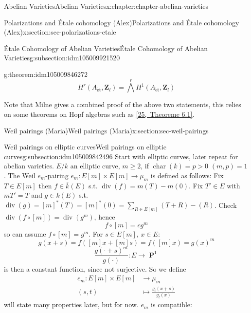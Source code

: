 \documentclass[oneside,10pt,]{book}
\numberwithin{equation}{section}
\newcommand{\lb}{[}
\newcommand{\rb}{]}
\newcommand{\ZZ}{\mathbf{Z}}
\newcommand{\et}{\mathrm{\acute{e}t}}
\DeclareMathOperator{\divisor}{div}
\DeclareMathOperator{\characteristic}{char}
\DeclareMathOperator{\PP}{\mathbf{P}}
\newcommand{\gt}{>}
\newcommand{\amp}{&}
\begin{document}
\begin{chapterptx}{Abelian Varieties}{}{Abelian Varieties}{}{}{x:chapter:chapter-abelian-varieties}
\begin{sectionptx}{Polarizations and Étale cohomology (Alex)}{}{Polarizations and Étale cohomology (Alex)}{}{}{x:section:sec-polarizations-etale}
\begin{subsectionptx}{Étale Cohomology of Abelian Varieties}{}{Étale Cohomology of Abelian Varieties}{}{}{g:subsection:idm105009921520}
\begin{theorem}{}{}{g:theorem:idm105009846272}
%
\begin{equation*}
H^r(A_\et, \ZZ_l) = \bigwedge^r H^1(A_\et, \ZZ_l)
\end{equation*}
%
\end{theorem}
Note that Milne gives a combined proof of the above two statements, this relies on some theorems on Hopf algebras such as \hyperlink{x:biblio:bib-borel-hopf}{[25,~Theoreme 6.1]}.%
\end{subsectionptx}
\end{sectionptx}
%
%
\typeout{************************************************}
\typeout{************************************************}
%
\begin{sectionptx}{Weil pairings (Maria)}{}{Weil pairings (Maria)}{}{}{x:section:sec-weil-pairings}
%
%
\typeout{************************************************}
\typeout{************************************************}
%
\begin{subsectionptx}{Weil pairings on elliptic curves}{}{Weil pairings on elliptic curves}{}{}{g:subsection:idm105009842496}
Start with elliptic curves, later repeat for abelian varieties. \(E/k\) an elliptic curve, \(m\ge 2\), if \(\characteristic(k) = p \gt 0\) \((m,p) = 1\). The Weil \(e_m\)-pairing \(e_m \colon E\lb m\rb \times E\lb m \rb \to \mu_m\) is defined as follows: Fix \(T\in E\lb m \rb\) then \(f\in \overline  k (E)\) s.t. \(\divisor(f) = m(T) - m(0)\). Fix \(T' \in E\) with \(mT' = T\) and \(g\in \overline k(E)\) s.t. \(\divisor(g) = \lb m \rb^*(T) = \lb m \rb^*(0)= \sum_{R\in E\lb m \rb} (T+R) - (R)\). Check \(\divisor (f\circ \lb m \rb) = \divisor(g^m)\), hence%
\begin{equation*}
f\circ [m] = c g^m
\end{equation*}
so can assume \(f\circ \lb m \rb = g^m\). For \(s \in E\lb m \rb\), \(x\in E\):%
\begin{equation*}
g(x + s) = f([m]x + [m]s) = f([m]x) = g(x)^m
\end{equation*}
%
\begin{equation*}
\frac{g(\cdot + s)^m}{g(\cdot)} \colon E \to \PP^1
\end{equation*}
is then a constant function, since not surjective. So we define%
\begin{align*}
e_m\colon E[m]\times E[m] \amp\to \mu_m\\
(s,t)\amp \mapsto \frac{g_t(x+s)}{g_t(x)}
\end{align*}
will state many properties later, but for now. \(e_m\) is compatible:%

\end{subsectionptx}
\end{sectionptx}
\end{chapterptx}
\end{document}
